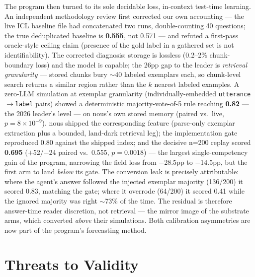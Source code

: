 \documentclass{article}
\newcommand{\nous}{\textsf{nous}}
\begin{document}
The program then turned to its sole decidable loss, in-context test-time
learning. An independent methodology review first corrected our own
accounting --- the live ICL baseline file had concatenated two runs,
double-counting 40 questions; the true deduplicated baseline is
\textbf{0.555}, not 0.571 --- and refuted a first-pass oracle-style ceiling
claim (presence of the gold label in a gathered set is not identifiability).
The corrected diagnosis: storage is lossless (0.2--2\% chunk-boundary loss)
and the model is capable; the 26pp gap to the leader is \emph{retrieval
granularity} --- stored chunks bury $\sim$40 labeled exemplars each, so
chunk-level search returns a similar region rather than the $k$ nearest
labeled examples. A zero-LLM simulation at exemplar granularity
(individually-embedded \texttt{utterance$\to$label} pairs) showed a
deterministic majority-vote-of-5 rule reaching \textbf{0.82} --- the 2026
leader's level --- on \nous{}'s own stored memory (paired vs.\ live,
$p{=}8{\times}10^{-9}$). \nous{} shipped the corresponding feature
(parse-only exemplar extraction plus a bounded, land-dark retrieval leg);
the implementation gate reproduced 0.80 against the shipped index; and the
decisive n=200 replay scored \textbf{0.695} ($+$52/$-$24 paired vs.\ 0.555,
$p{=}0.0018$) --- the largest single-competency gain of the program,
narrowing the field loss from $-$28.5pp to $-$14.5pp, but the first arm to
land \emph{below} its gate. The conversion leak is precisely attributable:
where the agent's answer followed the injected exemplar majority (136/200)
it scored 0.83, matching the gate; where it overrode (64/200) it scored
0.41 while the ignored majority was right $\sim$73\% of the time. The
residual is therefore answer-time reader discretion, not retrieval --- the
mirror image of the substrate arms, which converted \emph{above} their
simulations. Both calibration asymmetries are now part of the program's
forecasting method.

\section{Threats to Validity}
\label{sec:threats}
\end{document}
